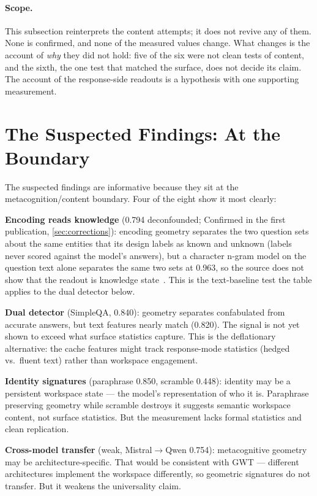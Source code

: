 \documentclass[11pt,a4paper]{article}
\begin{document}
\paragraph{Scope.} This subsection reinterprets the content attempts;
it does not revive any of them. None is confirmed, and none of the
measured values change. What changes is the account of \emph{why} they
did not hold: five of the six were not clean tests of content, and the
sixth, the one test that matched the surface, does not decide its
claim. The account of the response-side readouts is
a hypothesis with one supporting measurement.

\section{The Suspected Findings: At the Boundary}
\label{sec:suspected}

The suspected findings are informative because they sit at the
metacognition/content boundary. Four of the eight show it most
clearly:

\textbf{Encoding reads knowledge} (0.794 deconfounded; Confirmed in
the first publication, \cref{sec:corrections}): encoding geometry
separates the two question sets about the same entities that its
design labels as known and unknown (labels never scored against the
model's answers), but a character n-gram model on the
question text alone separates the same two sets at 0.963, so the
source does not show that the readout is knowledge
state~\citep{lyra2026decision}. This is the text-baseline test the
table applies to the dual detector below.

\textbf{Dual detector} (SimpleQA, 0.840): geometry separates
confabulated from accurate answers, but text features nearly match
(0.820). The signal is not yet shown to exceed what surface statistics
capture. This is the deflationary alternative: the cache features might
track response-mode statistics (hedged vs.\ fluent text) rather than
workspace engagement.

\textbf{Identity signatures} (paraphrase 0.850, scramble 0.448):
identity may be a persistent workspace state --- the model's
representation of who it is. Paraphrase preserving geometry while
scramble destroys it suggests semantic workspace content, not surface
statistics. But the measurement lacks formal statistics and clean
replication.

\textbf{Cross-model transfer} (weak, Mistral$\to$Qwen 0.754):
metacognitive geometry may be architecture-specific. That would be
consistent with GWT --- different architectures implement the workspace
differently, so geometric signatures do not transfer. But it weakens
the universality claim.
\end{document}
